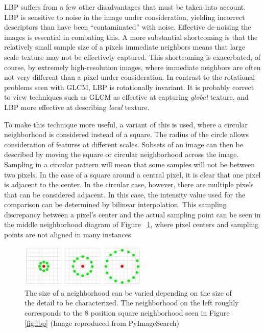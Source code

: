\documentclass[letterpaper]{report}
\begin{document}
LBP suffers from a few other disadvantages that must be taken into account. LBP is sensitive to noise in the image under consideration, yielding incorrect descriptors than have been ``contaminated'' with noise. Effective de-noising the images is essential in combating this. A more substantial shortcoming is that the relatively small sample size of a pixels immediate neighbors means that large scale texture may not be effectively captured. This shortcoming is exacerbated, of course, by extremely high-resolution images, where immediate neighbors are often not very different than a pixel under consideration. In contrast to the rotational problems seen with GLCM, LBP is rotationally invariant. It is probably correct to view techniques such as GLCM as effective at capturing \textit{global} texture, and LBP more effective at describing \textit{local} texture.

To make this technique more useful, a variant of this is used, where a circular neighborhood is considered instead of a square. The radius of the circle allows consideration of features at different scales.  Subsets of an image can then be described by moving the square or circular neighborhood across the image.  Sampling in a circular pattern will mean that some samples will not be between two pixels. In the case of a square around a central pixel, it is clear that one pixel is adjacent to the center. In the circular case, however, there are multiple pixels that can be considered adjacent. In this case, the intensity value used for the comparison can be determined by bilinear interpolation. This sampling discrepancy between a pixel's center and the actual sampling point can be seen in the middle neighborhood diagram of Figure ~\ref{fig:lbp-circular}, where pixel centers and sampling points are not aligned in many instances.

\begin{figure}[H]
	\centering
	\includegraphics[height=2cm]{./figures/lbp_circular.jpg}	
	\caption[Local Binary Pattern circular neighborhoods]{The size of a neighborhood can be varied depending on the size of the detail to be characterized. The neighborhood on the left roughly corresponds to the 8 position square neighborhood seen in Figure \ref{fig:lbp} (Image reproduced from PyImageSearch)}
	\label{fig:lbp-circular}
\end{figure}
\end{document}
